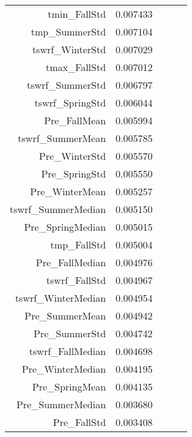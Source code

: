 \begin{tabular}{rrrrr}
tmin_FallStd & 0.007433 \\
tmp_SummerStd & 0.007104 \\
tswrf_WinterStd & 0.007029 \\
tmax_FallStd & 0.007012 \\
tswrf_SummerStd & 0.006797 \\
tswrf_SpringStd & 0.006044 \\
Pre_FallMean & 0.005994 \\
tswrf_SummerMean & 0.005785 \\
Pre_WinterStd & 0.005570 \\
Pre_SpringStd & 0.005550 \\
Pre_WinterMean & 0.005257 \\
tswrf_SummerMedian & 0.005150 \\
Pre_SpringMedian & 0.005015 \\
tmp_FallStd & 0.005004 \\
Pre_FallMedian & 0.004976 \\
tswrf_FallStd & 0.004967 \\
tswrf_WinterMedian & 0.004954 \\
Pre_SummerMean & 0.004942 \\
Pre_SummerStd & 0.004742 \\
tswrf_FallMedian & 0.004698 \\
Pre_WinterMedian & 0.004195 \\
Pre_SpringMean & 0.004135 \\
Pre_SummerMedian & 0.003680 \\
Pre_FallStd & 0.003408 \\
\bottomrule
\end{tabular}
